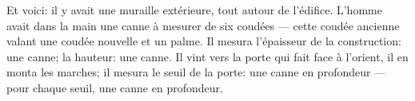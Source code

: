 Et voici: il y avait une muraille extérieure, tout autour de l’édifice.
L’homme avait dans la main une canne à mesurer de six coudées
	--- cette coudée ancienne valant une coudée nouvelle et un palme.
Il mesura l’épaisseur de la construction: une canne;
	la hauteur: une canne.
Il vint vers la porte qui fait face à l’orient, il en monta les marches;
	il mesura le seuil de la porte: une canne en profondeur
	--- pour chaque seuil, une canne en profondeur.
